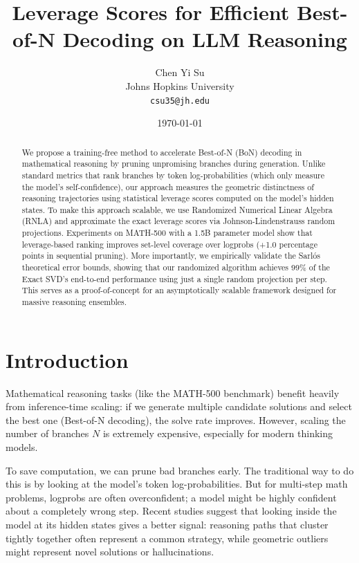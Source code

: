 \documentclass[11pt]{article}
\title{Leverage Scores for Efficient Best-of-N Decoding on LLM Reasoning}
\author{
  Chen Yi Su \\
  Johns Hopkins University \\
  \texttt{csu35@jh.edu}
}
\date{\today}
\begin{document}
\maketitle

\begin{abstract}

We propose a training-free method to accelerate Best-of-N (BoN) decoding in mathematical reasoning by
 pruning unpromising branches during generation. Unlike standard metrics that rank branches by token log-probabilities (which only measure the model's self-confidence), our approach measures the geometric distinctness of reasoning trajectories using statistical leverage scores computed on the model's hidden states. To make this approach scalable, we use Randomized Numerical Linear Algebra (RNLA) and approximate the exact leverage scores via Johnson-Lindenstrauss random projections. Experiments on MATH-500 with a 1.5B parameter model show that leverage-based ranking improves set-level coverage over logprobs
 (+1.0 percentage points in sequential pruning). More importantly, we empirically validate the Sarlós theoretical error bounds, showing that our randomized algorithm achieves 99\% of the Exact SVD's end-to-end
 performance using just a single random projection per step. This serves as a proof-of-concept for an asymptotically scalable framework designed for massive reasoning ensembles.
\end{abstract}

\section{Introduction}

Mathematical reasoning tasks (like the MATH-500 benchmark) benefit heavily from inference-time scaling:
 if we generate multiple candidate solutions and select the best one (Best-of-N decoding), the solve rate
 improves. However, scaling the number of branches $N$ is extremely expensive, especially for
 modern thinking models.

To save computation, we can prune bad branches early. The traditional way to do this is by looking at the model's token log-probabilities. But for multi-step math problems, logprobs are often overconfident; a model might be highly confident about a completely wrong step. Recent studies suggest that looking inside the model at its hidden states gives a better signal: reasoning paths that cluster tightly together often represent a common strategy, while geometric outliers might represent novel solutions or hallucinations.
\end{document}

